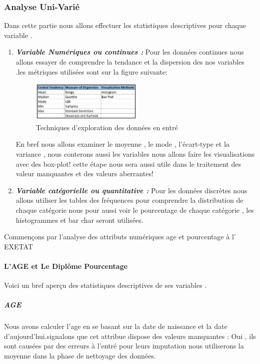 \subsubsection{Analyse Uni-Varié}
Dans cette partie nous allons effectuer les statistiques descriptives pour chaque variable .
\begin{enumerate}
	
	\item
	\emph{\textbf{Variable Numériques ou continues : }}Pour les données continues nous
	allons essayer de comprendre la tendance et la dispersion des nos
	variables .les métriques utilisées sont sur la figure suivante: 
	\begin{figure}[ht]
		\centering
		\includegraphics[width=0.5\textwidth]{fig/DataExploration.png}
		\caption[Short caption]{Techniques d'exploration des données en entré }
		\label{fig:DataExplora}
	\end{figure}
	En bref nous allons examiner le moyenne , le mode , l'écart-type et la
	variance , nous conterons aussi les variables nous allons faire les
	visualisations avec des box-plot! cette étape nous sera aussi utile
	dans le traitement des valeur manquantes et des valeurs aberrantes!
	\item
	\emph{\textbf{Variable catégorielle ou quantitative :}} Pour les données discrètes nous
	allons utiliser  les tables des fréquences pour comprendre la distribution de
	chaque catégorie nous pour aussi voir le pourcentage de chaque
	catégorie , les histogrammes et bar char seront utilisées.
\end{enumerate}
Commençons par l'analyse des attributs numériques age et pourcentage à l' \ac{EXETAT} 
\paragraph{L'AGE et Le Diplôme Pourcentage}
Voici un bref aperçu des statistiques descriptives de ses variables .
\subparagraph{AGE}
Nous avons calculer l'age en se basant sur la date de naissance et la date d'aujourd'hui.signalons que cet attribue dispose des valeurs manquantes : Oui , ils sont causées par des erreurs à l'entré pour leurs imputation nous utiliserons la moyenne dans la phase de nettoyage des données.
